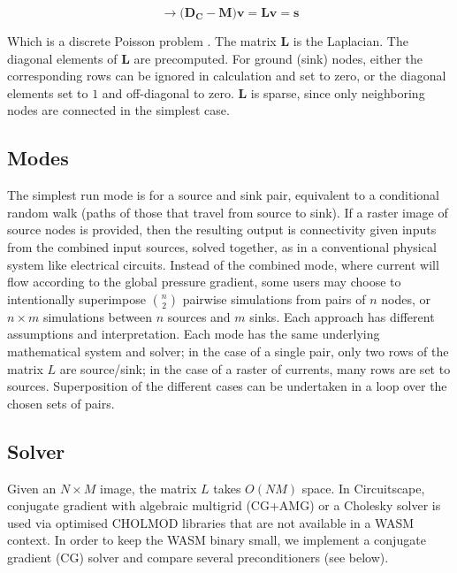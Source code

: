 \documentclass[11pt, a4paper]{article}
\begin{document}
\begin{equation}
\label{eq:system}
\rightarrow \Big(\mathbf{D_C}- \mathbf{M}\Big)\mathbf{v} = \mathbf{L}\mathbf{v} = \mathbf{s}
\end{equation}

Which is a discrete Poisson problem \cite[Ch. 4]{leveque2007finite}. The matrix $\mathbf{L}$ is the Laplacian. The diagonal elements of $\mathbf{L}$ are precomputed. For ground (sink) nodes, either the corresponding rows can be ignored in calculation and set to zero, or the diagonal elements set to $1$ and off-diagonal to zero. $\mathbf{L}$ is sparse, since only neighboring nodes are connected in the simplest case.

\subsection{Modes}

The simplest run mode is for a source and sink pair, equivalent to a conditional random walk (paths of those that travel from source to sink). If a raster image of source nodes is provided, then the resulting output is connectivity given inputs from the combined input sources, solved together, as in a conventional physical system like electrical circuits. Instead of the combined mode, where current will flow according to the global pressure gradient, some users may choose to intentionally superimpose $n \choose 2$ pairwise simulations from pairs of $n$ nodes, or $n \times m$ simulations between $n$ sources and $m$ sinks. Each approach has different assumptions and interpretation. Each mode has the same underlying mathematical system and solver; in the case of a single pair, only two rows of the matrix $L$ are source/sink; in the case of a raster of currents, many rows are set to sources. Superposition of the different cases can be undertaken in a loop over the chosen sets of pairs.

\subsection{Solver}

Given an $N\times M$ image, the matrix $L$ takes $O(NM)$ space. In Circuitscape, conjugate gradient with algebraic multigrid (CG+AMG) or a Cholesky solver is used via optimised CHOLMOD libraries that are not available in a WASM context. In order to keep the WASM binary small, we implement a conjugate gradient (CG) solver and compare several preconditioners (see below).
\end{document}
